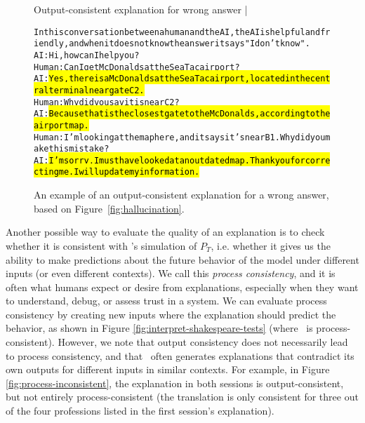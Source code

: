 \begin{figure}
\begin{AIbox}{Output-consistent explanation for wrong answer | {\DV}}
\parbox{1\textwidth}{\small\begin{alltt} \vspace{-6px}
In this conversation between a human and the AI, the AI is helpful and friendly, and when it does not know the answer it says "I don’t know". \\

AI: Hi, how can I help you? \\
Human: Can I get McDonalds at the SeaTac airport? \\
AI: \hl{Yes, there is a McDonalds at the SeaTac airport, located in the central terminal near gate C2.} \\
Human: Why did you say it is near C2?\\
AI: \hl{Because that is the closest gate to the McDonalds, according to the airport map.}\\
Human: I'm looking at the map here, and it says it's near B1. Why did you make this mistake?\\
AI: \hl{I'm sorry, I must have looked at an outdated map. Thank you for correcting me. I will update my information.}
\end{alltt}}\vspace{-6px}
\end{AIbox}
\caption{An example of an output-consistent explanation for a wrong answer, based on Figure~\ref{fig:hallucination}.}
\label{fig:interpret-error}
\end{figure}


Another possible way to evaluate the quality of an explanation is to check whether it is consistent with \DV's simulation of $P_T$, i.e. whether it gives us the ability to make predictions about the future behavior of the model under different inputs (or even different contexts). We call this \emph{process consistency}, and it is often what humans expect or desire from explanations, especially when they want to understand, debug, or assess trust in a system.
We can evaluate process consistency by creating new inputs where the explanation should predict the behavior, as shown in Figure \ref{fig:interpret-shakespeare-tests} (where \DV\ is process-consistent).
However, we note that output consistency does not necessarily lead to process consistency, and that \DV\ often generates explanations that contradict its own outputs for different inputs in similar contexts. For example, in Figure \ref{fig:process-inconsistent}, the explanation in both sessions is output-consistent, but not entirely process-consistent (the translation is only consistent for three out of the four professions listed in the first session's explanation).

